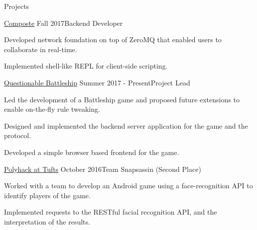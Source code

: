 \documentclass{resume} %
\begin{document}
\begin{rSection}{Projects}




\begin{rSubsection}
    {\href{https://composte.me}{Composte}}
    {Fall 2017}{Backend Developer}

\item Developed network foundation on top of ZeroMQ that enabled users to
    collaborate in real-time.

\item Implemented shell-like REPL for client-side scripting.

\end{rSubsection}

\begin{rSubsection}
    {\href{https://www.questionablebattleship.com/}{Questionable Battleship}}
    {Summer 2017 - Present}{Project Lead}

\item Led the development of a Battleship game and proposed future extensions to
    enable on-the-fly rule tweaking.

\item Designed and implemented the backend server application for the game and
    the protocol.

\item Developed a simple browser based frontend for the game.

\end{rSubsection}

\begin{rSubsection}
    {\href{http://2016.polyhack.tufts.io/}{Polyhack at Tufts}}
    {October 2016}{Team Snapsassin (Second Place)}

\item Worked with a team to develop an Android game using a face-recognition
    API to identify players of the game.

\item Implemented requests to the RESTful facial recognition API, and the
    interpretation of the results.


\end{rSubsection}
\end{rSection}
\end{document}
